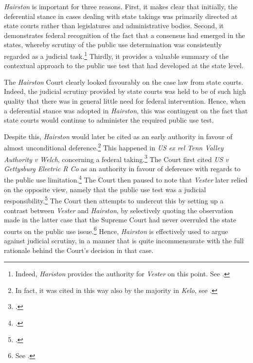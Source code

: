 {\it Hairston} is important for three reasons. First, it makes clear that initially, the deferential stance in cases dealing with state takings was primarily directed at state courts rather than legislatures and administrative bodies. Second, it demonstrates federal recognition of the fact that a consensus had emerged in the states, whereby scrutiny of the public use determination was consistently regarded as a judicial task.\footnote{Indeed, {\it Hariston} provides the authority for {\it Vester} on this point. See \cite[606]{vester30}.} Thirdly, it provides a valuable summary of the contextual approach to the public use test that had developed at the state level. 

The {\it Hairston} Court clearly looked favourably on the case law from state courts. Indeed, the judicial scrutiny provided by state courts was held to be of such high quality that there was in general little need for federal intervention. Hence, when a deferential stance was adopted in {\it Hairston}, this was contingent on the fact that state courts would continue to administer the required public use test.

Despite this, {\it Hairston} would later be cited as an early authority in favour of almost unconditional deference.\footnote{In fact, it was cited in this way also by the majority in {\it Kelo}, see \cite[482-483]{kelo05}.} This happened in {\it US ex rel Tenn Valley Authority v Welch}, concerning a federal taking.\footcite[552]{welch46} The Court first cited {\it US v Gettysburg Electric R Co} as an authority in favour of deference with regards to the public use limitation.\footcite{gettysburg96} The Court then paused to note that {\it Vester} later relied on the opposite view, namely that the public use test was a judicial responsibility.\footcite{vester30} The Court then attempts to undercut this by setting up a contrast between {\it Vester} and {\it Hairston}, by selectively quoting the observation made in the latter case that the Supreme Court had never overruled the state courts on the public use issue.\footnote{See \cite[552]{welch46}.} Hence, {\it Hairston} is effectively used to argue against judicial scrutiny, in a manner that is quite incommensurate with the full rationale behind the Court's decision in that case.

